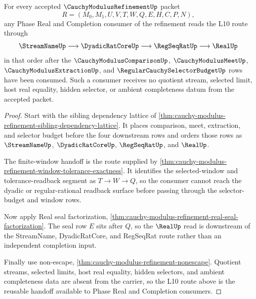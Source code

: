 \begin{theorem}
\label{thm:cauchy-modulus-refinement-l10-sibling-route}
For every accepted $\CauchyModulusRefinementUp$ packet
$$
R=(M_0,M_1,U,V,T,W,Q,E,H,C,P,N),
$$
any Phase Real and Completion consumer of the refinement reads the L10 route through
$$
\StreamNameUp \longrightarrow \DyadicRatCoreUp \longrightarrow \RegSeqRatUp \longrightarrow \RealUp
$$
in that order after the $\CauchyModulusComparisonUp$, $\CauchyModulusMeetUp$, $\CauchyModulusExtractionUp$, and $\RegularCauchySelectorBudgetUp$ rows have been consumed. Such a consumer receives no quotient stream, selected limit, host real equality, hidden selector, or ambient completeness datum from the accepted packet.
\end{theorem}
\begin{proof}
Start with the sibling dependency lattice of \autoref{thm:cauchy-modulus-refinement-sibling-dependency-lattice}. It places comparison, meet, extraction, and selector budget before the four downstream rows and orders those rows as $\StreamNameUp$, $\DyadicRatCoreUp$, $\RegSeqRatUp$, and $\RealUp$.

The finite-window handoff is the route supplied by \autoref{thm:cauchy-modulus-refinement-window-tolerance-exactness}. It identifies the selected-window and tolerance-readback segment as $T \longrightarrow W \longrightarrow Q$, so the consumer cannot reach the dyadic or regular-rational readback surface before passing through the selector-budget and window rows.

Now apply Real seal factorization, \autoref{thm:cauchy-modulus-refinement-real-seal-factorization}. The seal row $E$ sits after $Q$, so the $\RealUp$ read is downstream of the StreamName, DyadicRatCore, and RegSeqRat route rather than an independent completion input.

Finally use non-escape, \autoref{thm:cauchy-modulus-refinement-nonescape}. Quotient streams, selected limits, host real equality, hidden selectors, and ambient completeness data are absent from the carrier, so the L10 route above is the reusable handoff available to Phase Real and Completion consumers.
\end{proof}

